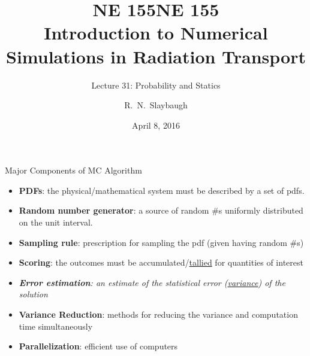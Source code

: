 \documentclass[xcolor=x11names,compress]{beamer}
\title{NE 155}
\author{R.\ N.\ Slaybaugh}
\date{April 8, 2016}
\renewcommand{\(}{\begin{columns}}
\renewcommand{\)}{\end{columns}}
\newcommand{\<}[1]{\begin{column}{#1}}
\renewcommand{\>}{\end{column}}
\begin{document}
\begin{frame}
\title{NE 155\\Introduction to Numerical Simulations in Radiation Transport}
\subtitle{Lecture 31: Probability and Statics}
\titlepage
\end{frame}

\begin{frame}{Major Components of MC Algorithm}

\begin{itemize}
  \item \textbf{PDFs}: the physical/mathematical system must be described by a set of pdfs.
  \pause
  \item \textbf{Random number generator}: a source of random \#s uniformly distributed on the unit interval.
  \pause
  \item \textbf{Sampling rule}: prescription for sampling the pdf (given having random \#s)
  \pause
  \item \textbf{Scoring}: the outcomes must be accumulated/\underline{tallied} for quantities of interest
  \pause
  \item \textit{\textbf{Error estimation}: an estimate of the statistical error (\underline{variance}) of the solution}
    \pause
  \item \textbf{Variance Reduction}: methods for reducing the variance and computation time simultaneously
    \pause
  \item \textbf{Parallelization}: efficient use of computers
\end{itemize}
\end{frame}
\end{document}
